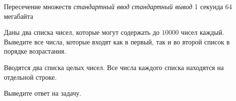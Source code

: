 \begin{problem}%
{Пересечение множеств}%
{\textsl{стандартный ввод}}%
{\textsl{стандартный вывод}}%
{1 секунда}%
{64 мегабайта}{}

Даны два списка чисел, которые могут содержать до $10000$ чисел каждый. Выведите все числа, которые входят как в первый, так и во второй список в порядке возрастания.

\InputFile

Вводятся два списка целых чисел. Все числа каждого списка находятся на отдельной строке.

\OutputFile

Выведите ответ на задачу.

\Examples

\begin{example}
%
\end{example}
\end{problem}